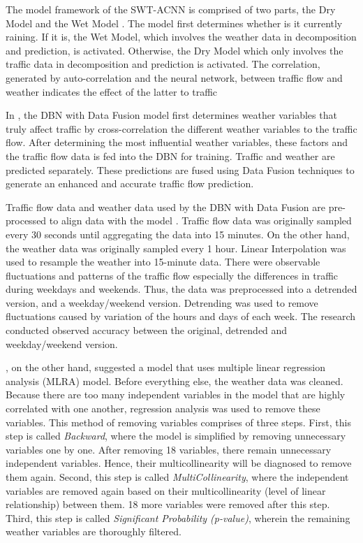 The model framework of the SWT-ACNN is comprised of two parts, the Dry Model and the Wet Model . The model first determines whether is it currently raining. If it is, the Wet Model, which involves the weather data in decomposition and prediction, is activated. Otherwise, the Dry Model which only involves the traffic data in decomposition and prediction is activated. The correlation, generated by auto-correlation and the neural network, between traffic flow and weather indicates the effect of the latter to traffic 

In , the DBN with Data Fusion model first determines weather variables that truly affect traffic by cross-correlation the different weather variables to the traffic flow. After determining the most influential weather variables, these factors and the traffic flow data is fed into the DBN for training. Traffic and weather are predicted separately. These predictions are fused using Data Fusion techniques to generate an enhanced and accurate traffic flow prediction. 

Traffic flow data and weather data used by the DBN with Data Fusion are pre-processed to align data with the model . Traffic flow data was originally sampled every 30 seconds until aggregating the data into 15 minutes. On the other hand, the weather data was originally sampled every 1 hour. Linear Interpolation was used to resample the weather into 15-minute data. There were observable fluctuations and patterns of the traffic flow especially the differences in traffic during weekdays and weekends. Thus, the data was preprocessed into a detrended version, and a weekday/weekend version. Detrending was used to remove fluctuations caused by variation of the hours and days of each week. The research conducted observed accuracy between the original, detrended and weekday/weekend version. 

, on the other hand, suggested a model that uses multiple linear regression analysis (MLRA) model. Before everything else, the weather data was cleaned. Because there are too many independent variables in the model that are highly correlated with one another, regression analysis was used to remove these variables. This method of removing variables comprises of three steps. First, this step is called \textit{Backward}, where the model is simplified by removing unnecessary variables one by one. After removing 18 variables, there remain unnecessary independent variables. Hence, their multicollinearity will be diagnosed to remove them again. Second, this step is called \textit{MultiCollinearity}, where the independent variables are removed again based on their multicollinearity (level of linear relationship) between them. 18 more variables were removed after this step. Third, this step is called \textit{Significant Probability (p-value)}, wherein the remaining weather variables are thoroughly filtered.





